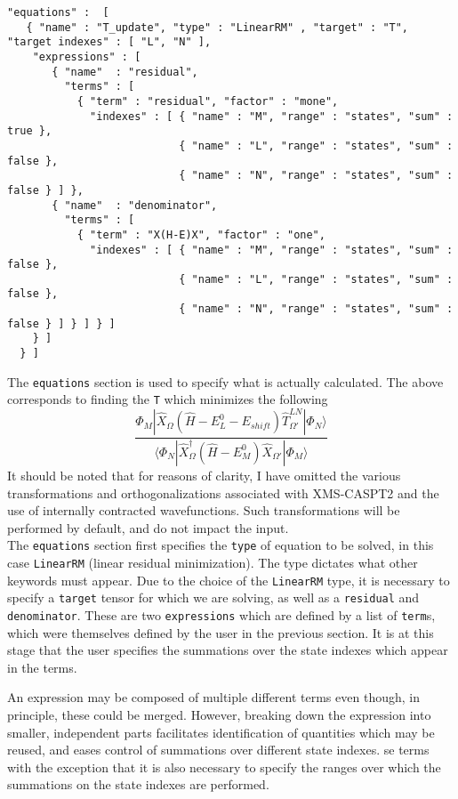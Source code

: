\begin{lstlisting}[label={lst:equations}]
"equations" :  [
   { "name" : "T_update", "type" : "LinearRM" , "target" : "T", "target indexes" : [ "L", "N" ],
    "expressions" : [
       { "name"  : "residual",
         "terms" : [
           { "term" : "residual", "factor" : "mone",
             "indexes" : [ { "name" : "M", "range" : "states", "sum" : true },
                           { "name" : "L", "range" : "states", "sum" : false },
                           { "name" : "N", "range" : "states", "sum" : false } ] },
       { "name"  : "denominator",
         "terms" : [
           { "term" : "X(H-E)X", "factor" : "one",                                                 
             "indexes" : [ { "name" : "M", "range" : "states", "sum" : false },
                           { "name" : "L", "range" : "states", "sum" : false },
                           { "name" : "N", "range" : "states", "sum" : false } ] } ] } ]
    } ]
  } ]
\end{lstlisting}         
The \texttt{equations} section is used to specify what is actually calculated. The above corresponds to
finding the \texttt{T} which minimizes the following
\begin{equation}
\frac{ \Phi_{M} |  \hat{X}_{\Omega} ( \hat{H}-E^{0}_{L}-E_{shift} )  \hat{T}^{LN}_{\Omega'} | \Phi_{N} \rangle } 
{ \langle \Phi_{N} | \hat{X}^{\dagger}_{\Omega}
  ( \hat{H}- E^{0}_{M} )
  \hat{X}_{\Omega'} | \Phi_{M} \rangle}
\end{equation}
It should be noted that for reasons of clarity, I have omitted the various transformations and orthogonalizations associated
with XMS-CASPT2 and the use of internally contracted wavefunctions. Such transformations 
will be performed by default, and do not impact the input. \\

\noindent The  \texttt{equations} section first specifies the \texttt{type} of equation to be solved, in
this case \texttt{LinearRM} (linear residual minimization). The type dictates what other keywords must appear.
Due to the choice of the \texttt{LinearRM} type, it is necessary to specify a \texttt{target} tensor for 
which we are solving, as well as a \texttt{residual} and \texttt{denominator}. These are two \texttt{expressions}
which are defined by a list of \texttt{term}s, which were themselves defined by the user in the previous section. 
It is at this stage that the user specifies the summations over the state indexes which appear in the terms.

\noindent An expression may be composed of multiple different terms even though, in principle, these could be merged.
However, breaking down the expression into smaller, independent parts facilitates identification of
quantities which may be reused, and eases control of summations over different state indexes. 
se terms with the exception that it is also necessary to specify the ranges over
which the summations on the state indexes are performed.
